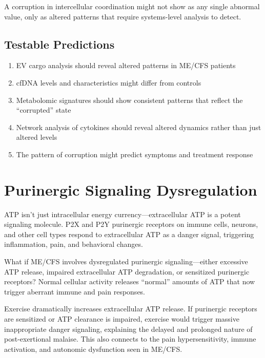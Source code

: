 A corruption in intercellular coordination might not show as any single abnormal value, only as altered patterns that require systems-level analysis to detect.

\subsection{Testable Predictions}

\begin{enumerate}
    \item EV cargo analysis should reveal altered patterns in ME/CFS patients
    \item cfDNA levels and characteristics might differ from controls
    \item Metabolomic signatures should show consistent patterns that reflect the ``corrupted'' state
    \item Network analysis of cytokines should reveal altered dynamics rather than just altered levels
    \item The pattern of corruption might predict symptoms and treatment response
\end{enumerate}


\section{Purinergic Signaling Dysregulation}
\label{sec:purinergic}

\begin{open_question}
ATP isn't just intracellular energy currency---extracellular ATP is a potent signaling molecule. P2X and P2Y purinergic receptors on immune cells, neurons, and other cell types respond to extracellular ATP as a danger signal, triggering inflammation, pain, and behavioral changes.

What if ME/CFS involves dysregulated purinergic signaling---either excessive ATP release, impaired extracellular ATP degradation, or sensitized purinergic receptors? Normal cellular activity releases ``normal'' amounts of ATP that now trigger aberrant immune and pain responses.

Exercise dramatically increases extracellular ATP release. If purinergic receptors are sensitized or ATP clearance is impaired, exercise would trigger massive inappropriate danger signaling, explaining the delayed and prolonged nature of post-exertional malaise. This also connects to the pain hypersensitivity, immune activation, and autonomic dysfunction seen in ME/CFS.
\end{open_question}


